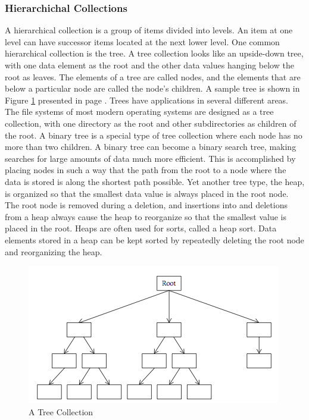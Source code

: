 \documentclass[12pt,a4paper,final,twoside,titlepage]{book}
\begin{document}
\subsubsection{Hierarchichal Collections}
A hierarchical collection is a group of items divided into levels. An item at one level can have successor items located at the next lower level. One common hierarchical collection is the tree. A tree collection looks like an upside-down tree, with one data element as the root and the other data values hanging below the root as leaves. The elements of a tree are called nodes, and the elements that are below a particular node are called the node’s children. A sample tree is shown in Figure \ref{ATreeCollection} presented in page \pageref{ATreeCollection}. Trees have applications in several different areas. The file systems of most modern operating systems are designed as a tree collection, with one directory as the root and other subdirectories as children of the root.
A binary tree is a special type of tree collection where each node has no more than two children. A binary tree can become a binary search tree, making searches for large amounts of data much more efficient. This is accomplished by placing nodes in such a way that the path from the root to a node where the data is stored is along the shortest path possible.
Yet another tree type, the heap, is organized so that the smallest data value is always placed in the root node. The root node is removed during a deletion, and insertions into and deletions from a heap always cause the heap to reorganize so that the smallest value is placed in the root. Heaps are often used for sorts, called a heap sort. Data elements stored in a heap can be kept sorted by repeatedly deleting the root node and reorganizing the heap.
\begin{figure}
\begin{center}
\includegraphics[scale=0.75]{ATreeCollection}
\end{center}
\caption{A Tree Collection}
\label{ATreeCollection}
\end{figure}
\end{document}
